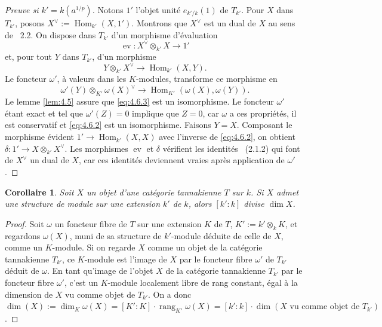 \documentclass[11pt,a4paper]{article}
\theoremstyle{plain}
\newtheorem{corollary}[theorem]{Corollaire}
\theoremstyle{definition}
\DeclareMathOperator{\Hom}{Hom}
\DeclareMathOperator{\ev}{ev}
\DeclareMathOperator{\rang}{rang}
\begin{document}
\begin{proof}[Preuve si $k' = k(a^{1/p})$]
Notons $1'$ l'objet unit\'e $e_{k'/k}(1)$ de $T_{k'}$. Pour $X$ dans $T_{k'}$, posons $X^\vee := \Hom_{k'}(X, 1')$. Montrons que $X^\vee$ est un dual de $X$ au sens de \cite{Deligne1990}~2.2. On dispose dans $T_{k'}$ d'un morphisme d'\'evaluation
\begin{equation}\label{eq:4.6.1}
\ev: X^\vee \otimes_{k'} X \longrightarrow 1'
\end{equation}
et, pour tout $Y$ dans $T_{k'}$, d'un morphisme
\begin{equation}\label{eq:4.6.2}
Y \otimes_{k'} X^\vee \longrightarrow \Hom_{k'}(X, Y).
\end{equation}
Le foncteur $\omega'$, \`a valeurs dans les $K$-modules, transforme ce morphisme en
\begin{equation}\label{eq:4.6.3}
\omega'(Y) \otimes_{K'} \omega(X)^\vee \longrightarrow \Hom_{K'}(\omega(X), \omega(Y)).
\end{equation}
Le lemme \ref{lem:4.5} assure que \eqref{eq:4.6.3} est un isomorphisme. Le foncteur $\omega'$ \'etant exact et tel que $\omega'(Z) = 0$ implique que $Z = 0$, car $\omega$ a ces propri\'et\'es, il est conservatif et \eqref{eq:4.6.2} est un isomorphisme. Faisons $Y = X$. Composant le morphisme \'evident $1' \to \Hom_{k'}(X, X)$ avec l'inverse de \eqref{eq:4.6.2}, on obtient $\delta: 1' \to X \otimes_{k'} X^\vee$. Les morphismes $\ev$ et $\delta$ v\'erifient les identit\'es \cite{Deligne1990}~(2.1.2) qui font de $X^\vee$ un dual de $X$, car ces identit\'es deviennent vraies apr\`es application de $\omega'$.
\end{proof}

\begin{corollary}\label{cor:4.7}
Soit $X$ un objet d'une cat\'egorie tannakienne $T$ sur $k$. Si $X$ admet une structure de module sur une extension $k'$ de $k$, alors $[k':k]$ divise $\dim X$.
\end{corollary}

\begin{proof}
Soit $\omega$ un foncteur fibre de $T$ sur une extension $K$ de $T$, $K' := k' \otimes_k K$, et regardons $\omega(X)$, muni de sa structure de $k'$-module d\'eduite de celle de $X$, comme un $K$-module. Si on regarde $X$ comme un objet de la cat\'egorie tannakienne $T_{k'}$, ce $K$-module est l'image de $X$ par le foncteur fibre $\omega'$ de $T_{k'}$ d\'eduit de $\omega$. En tant qu'image de l'objet $X$ de la cat\'egorie tannakienne $T_{k'}$ par le foncteur fibre $\omega'$, c'est un $K$-module localement libre de rang constant, \'egal \`a la dimension de $X$ vu comme objet de $T_{k'}$. On a donc $\dim(X) := \dim_K \omega(X) = [K':K] \cdot \rang_{K'} \omega(X) = [k':k] \cdot \dim(X \text{ vu comme objet de } T_{k'})$.
\end{proof}
\end{document}
